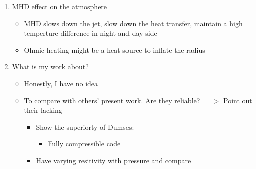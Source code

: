 \documentclass[11pt]{article}
\begin{document}
\begin{enumerate}
\item MHD effect on the atmosphere
\begin{itemize}
\item MHD slows down the jet, slow down the heat transfer, maintain a high temperture difference in night and day side
\item Ohmic heating might be a heat source to inflate the radius
\end{itemize}


\item What is my work about?
\begin{itemize}
\item Honestly, I have no idea
\item To compare with others' present work. Are they reliable? $=>$ Point out their lacking
\begin{itemize}
\item Show the superiorty of Dumses:
\begin{itemize}
\item Fully compressible code
\end{itemize}
\item Have varying resitivity with pressure and compare 
\end{itemize}
\end{itemize}

\end{enumerate}
\end{document}
